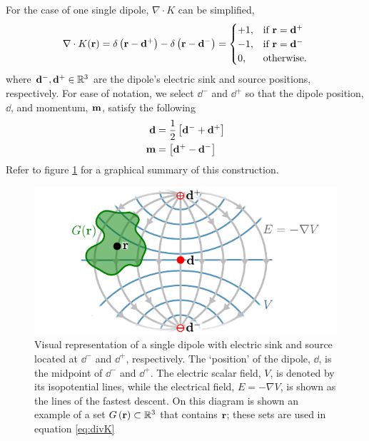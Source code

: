 For the case of one single dipole, $\nabla \cdot K$ can be simplified,
\begin{equation}
\nabla \cdot K(\mathbf{r}) = {\delta\left( \mathbf{r}-\mathbf{d}^+ \right) - \delta\left( \mathbf{r}-\mathbf{d}^- \right)} =
\begin{cases}
+1, &\text{if } \mathbf{r}=\mathbf{d}^+ \\
-1, &\text{if } \mathbf{r}=\mathbf{d}^- \\
0, &\text{otherwise}.
\end{cases}
\label{eq:model2}
\end{equation}
where $\mathbf{d}^-, \mathbf{d}^+ \in \mathbb{R}^3$ are the dipole's electric sink and source positions, respectively. 
%
For ease of notation, we select $\dd^-$ and $\dd^+$ so that the dipole position, $\dd$, and momentum, $\mathbf{m}$, satisfy the following
\begin{align}
    \mathbf{d} &= \frac{1}{2}\left[ \mathbf{d}^-+\mathbf{d}^+ \right] 
    \\
    \mathbf{m} &= \left[ \mathbf{d}^+-\mathbf{d}^- \right]
\end{align}
%
Refer to figure \ref{fig:diagrams1} for a graphical summary of this construction.

\begin{figure}[ht]
\centering
\includegraphics{./img/CurrDensField.pdf}
\caption{Visual representation of a single dipole with electric sink and source located at $\dd^-$ and $\dd^+$, respectively.
%
The `position' of the dipole, $\dd$, is the midpoint of $\dd^-$ and $\dd^+$.
%
The electric scalar field, $V$, is denoted by its isopotential lines, while the electrical field, $E= -\nabla V$, is shown as the lines of the fastest descent.
%
On this diagram is shown an example of a set $G\left( \mathbf{r} \right) \subset \mathbb{R}^3$ that contains $\mathbf{r}$; these sets are used in equation \eqref{eq:divK}
%
}
\label{fig:diagrams1}
\end{figure}

